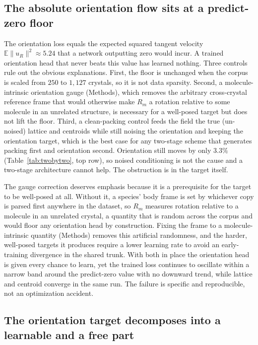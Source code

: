 \documentclass[10pt]{article}
\begin{document}
\subsection{The absolute orientation flow sits at a predict-zero floor}

The orientation loss equals the expected squared tangent velocity
$\mathbb{E}\lVert u_R\rVert^2\approx 5.24$ that a network outputting zero would
incur. A trained orientation head that never beats this value has learned
nothing. Three controls rule out the obvious explanations. First, the floor is
unchanged when the corpus is scaled from $250$ to $1{,}127$ crystals, so it is
not data sparsity. Second, a molecule-intrinsic orientation gauge (Methods),
which removes the arbitrary cross-crystal reference frame that would otherwise
make $R_m$ a rotation relative to some molecule in an unrelated structure, is
necessary for a well-posed target but does not lift the floor. Third, a
clean-packing control feeds the field the true (un-noised) lattice and
centroids while still noising the orientation and keeping the orientation
target, which is the best case for any two-stage scheme that generates packing
first and orientation second. Orientation still moves by only $3.3\%$
(Table~\ref{tab:twobytwo}, top row), so noised conditioning is not the cause and
a two-stage architecture cannot help. The obstruction is in the target itself.

The gauge correction deserves emphasis because it is a prerequisite for the
target to be well-posed at all. Without it, a species' body frame is set by
whichever copy is parsed first anywhere in the dataset, so $R_m$ measures
rotation relative to a molecule in an unrelated crystal, a quantity that is
random across the corpus and would floor any orientation head by construction.
Fixing the frame to a molecule-intrinsic quantity (Methods) removes this
artificial randomness, and the harder, well-posed targets it produces require a
lower learning rate to avoid an early-training divergence in the shared trunk.
With both in place the orientation head is given every chance to learn, yet the
trained loss continues to oscillate within a narrow band around the
predict-zero value with no downward trend, while lattice and centroid converge
in the same run. The failure is specific and reproducible, not an optimization
accident.

\subsection{The orientation target decomposes into a learnable and a free part}
\end{document}
